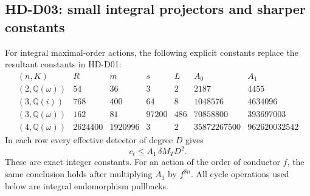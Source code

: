\subsection{HD-D03: small integral projectors and sharper constants}
\label{sec:small-projectors}

For integral maximal-order actions, the following explicit constants
replace the resultant constants in HD-D01:
\[
\begin{array}{c|r|r|r|r|r|r}
(n,K)&R&m&s&L&A_0&A_1\\ \hline
(2,\mathbb Q(\omega))&54&36&3&2&
2187&4455\\
(3,\mathbb Q(i))&768&400&64&8&
1048576&4634096\\
(3,\mathbb Q(\omega))&162&81&97200&486&
70858800&393697003\\
(4,\mathbb Q(\omega))&2624400&1920996&3&2&
35872267500&962620032542
\end{array}
\]
In each row every effective detector of degree \(D\) gives
\[
 c_t\le A_1\,\delta M_T D^2.
\]
These are exact integer constants. For an action of the order of
conductor \(f\), the same conclusion holds after multiplying \(A_1\)
by \(f^{8n}\). All cycle operations used below are integral
endomorphism pullbacks.

